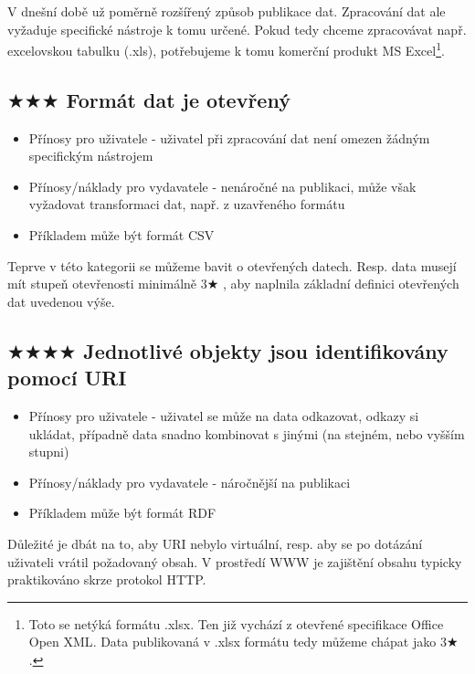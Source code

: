 V dnešní době už poměrně rozšířený způsob publikace dat. Zpracování dat ale vyžaduje specifické nástroje k tomu určené. Pokud tedy chceme zpracovávat např. excelovskou tabulku (.xls), potřebujeme k tomu komerční produkt MS Excel\footnote{Toto se netýká formátu .xlsx. Ten již vychází z otevřené specifikace Office Open XML\cite{OOXML}. Data publikovaná v .xlsx formátu tedy můžeme chápat jako 3$\bigstar$.}. 

\subsection*{$\bigstar\bigstar\bigstar$ Formát dat je otevřený}

\medskip

\begin{itemize}
\item Přínosy pro uživatele - uživatel při zpracování dat není omezen žádným specifickým nástrojem
\item Přínosy/náklady pro vydavatele - nenáročné na publikaci, může však vyžadovat transformaci dat, např. z uzavřeného formátu
\item Příkladem může být formát CSV
\end{itemize}

Teprve v této kategorii se můžeme bavit o  otevřených datech. Resp. data musejí mít stupeň otevřenosti minimálně 3$\bigstar$ , aby naplnila základní definici otevřených dat uvedenou výše.

\subsection*{$\bigstar\bigstar\bigstar\bigstar$ Jednotlivé objekty jsou identifikovány pomocí URI}

\medskip

\begin{itemize}
\item Přínosy pro uživatele - uživatel se může na data odkazovat, odkazy si ukládat, případně data snadno kombinovat s jinými (na stejném, nebo vyšším stupni)
\item Přínosy/náklady pro vydavatele - náročnější na publikaci
\item Příkladem může být formát RDF
\end{itemize}

Důležité je dbát na to, aby URI nebylo virtuální, resp. aby se po dotázání uživateli vrátil požadovaný obsah. V prostředí WWW je zajištění obsahu typicky praktikováno skrze protokol HTTP. 

